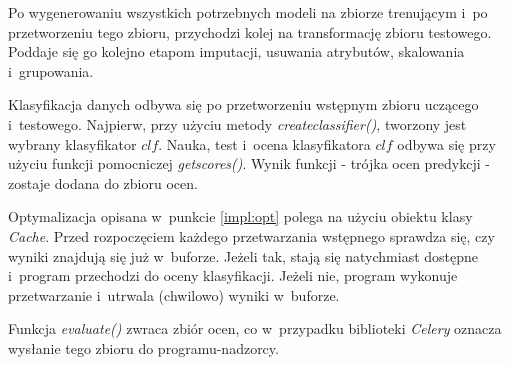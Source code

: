 \documentclass[../thesis.tex]{subfiles}
\begin{document}
Po wygenerowaniu wszystkich potrzebnych modeli na zbiorze trenującym i~po przetworzeniu tego zbioru, przychodzi kolej na transformację zbioru testowego. Poddaje się go kolejno etapom imputacji, usuwania atrybutów, skalowania i~grupowania.

Klasyfikacja danych odbywa się po przetworzeniu wstępnym zbioru uczącego i~testowego. Najpierw, przy użyciu metody \emph{create\textunderscore classifier()}, tworzony jest wybrany klasyfikator $clf$. Nauka, test i~ocena klasyfikatora $clf$ odbywa się przy użyciu funkcji pomocniczej \emph{get\textunderscore scores()}. Wynik funkcji - trójka ocen predykcji - zostaje dodana do zbioru ocen.

Optymalizacja opisana w~punkcie \ref{impl:opt} polega na użyciu obiektu klasy \emph{Cache}. Przed rozpoczęciem każdego przetwarzania wstępnego sprawdza się, czy wyniki znajdują się już w~buforze. Jeżeli tak, stają się natychmiast dostępne i~program przechodzi do oceny klasyfikacji. Jeżeli nie, program wykonuje przetwarzanie i~utrwala (chwilowo) wyniki w~buforze.

Funkcja \emph{evaluate()} zwraca zbiór ocen, co w~przypadku biblioteki \emph{Celery} oznacza wysłanie tego zbioru do programu-nadzorcy.
\end{document}
